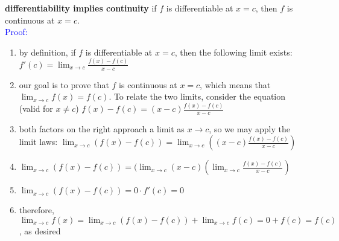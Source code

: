 \documentclass{article}
\begin{document}
\textbf{differentiability implies continuity} if $f$ is differentiable at $x = c$, then $f$ is continuous at $x = c$.\\
\textcolor{blue}{Proof:}
	\begin{enumerate}
		\item by definition, if $f$ is differentiable at $x = c$, then the following limit exists: $f'(c) = \lim_{x \to c}\frac{f(x) - f(c)}{x - c}$
		\item our goal is to prove that $f$ is continuous at $x = c$, which means that $\lim_{x \to c}f(x) = f(c)$. To relate the two limits, consider the equation (valid for $x \neq c$) $f(x) - f(c) = (x - c)\frac{f(x) - f(c)}{x - c}$
		\item both factors on the right approach a limit as $x \to c$, so we may apply the limit laws: $\lim_{x \to c}(f(x) - f(c)) = \lim_{x \to c}((x - c)\frac{f(x) - f(c)}{x - c})$
		\item $\lim_{x \to c}(f(x) - f(c)) = (\lim_{x \to c}(x - c)(\lim_{x \to c}\frac{f(x) - f(c)}{x - c})$
		\item $\lim_{x \to c}(f(x) - f(c)) = 0 \cdot f'(c) = 0$
		\item therefore, $\lim_{x \to c}f(x) = \lim_{x \to c}(f(x) - f(c)) + \lim_{x \to c}f(c) = 0 + f(c) = f(c)$, as desired
	\end{enumerate}
\end{document}
